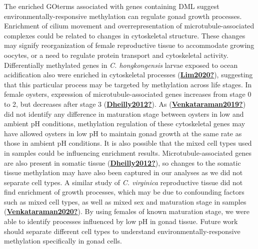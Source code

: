 \documentclass [11pt, proquest] {uwthesis}[2015/03/03]
\begin{document}
The enriched GOterms associated with genes containing DML suggest environmentally-responsive methylation can regulate gonad growth processes. Enrichment of cilium movement and overrepresentation of microtubule-associated complexes could be related to changes in cytoskeletal structure. These changes may signify reorganization of female reproductive tissue to accommodate growing oocytes, or a need to regulate protein transport and cytoskeletal activity. Differentially methylated genes in \emph{C. hongkongensis} larvae exposed to ocean acidification also were enriched in cytoskeletal processes (\protect\hyperlink{ref-Lim2020}{\textbf{Lim2020?}}), suggesting that this particular process may be targeted by methylation across life stages. In female oysters, expression of microtubule-associated genes increases from stage 0 to 2, but decreases after stage 3 (\protect\hyperlink{ref-Dheilly2012}{\textbf{Dheilly2012?}}). As (\protect\hyperlink{ref-Venkataraman2019}{\textbf{Venkataraman2019?}}) did not identify any difference in maturation stage between oysters in low and ambient pH conditions, methylation regulation of these cytoskeletal genes may have allowed oysters in low pH to maintain gonad growth at the same rate as those in ambient pH conditions. It is also possible that the mixed cell types used in samples could be influencing enrichment results. Microtubule-associated genes are also present in somatic tissue (\protect\hyperlink{ref-Dheilly2012}{\textbf{Dheilly2012?}}), so changes to the somatic tissue methylation may have also been captured in our analyses as we did not separate cell types. A similar study of \emph{C. virginica} reproductive tissue did not find enrichment of growth processes, which may be due to confounding factors such as mixed cell types, as well as mixed sex and maturation stage in samples (\protect\hyperlink{ref-Venkataraman2020}{\textbf{Venkataraman2020?}}). By using females of known maturation stage, we were able to identify processes influenced by low pH in gonad tissue. Future work should separate different cell types to understand environmentally-responsive methylation specifically in gonad cells.
\end{document}

